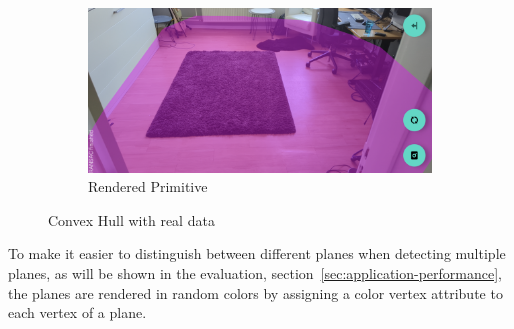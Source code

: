 \begin{figure}[h!tp]
    \vspace{0.5em}

    \begin{subfigure}[b]{0.8\textwidth}
        \centering
        \includegraphics[width=\linewidth]{images/hull}
        \caption{Rendered Primitive}
    \end{subfigure}%
    \caption{Convex Hull with real data}
    \label{fig:convex-hull}
\end{figure}

To make it easier to distinguish between different planes when detecting multiple planes, as will be shown in the evaluation,
section~\ref{sec:application-performance}, the planes are rendered in random colors by assigning a color vertex attribute to each vertex of a plane.

